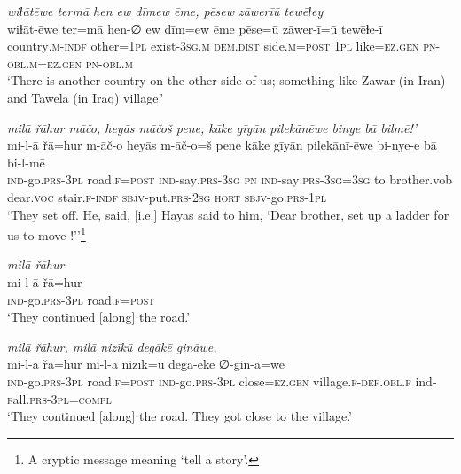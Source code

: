 \ea \label{ŽH.6}
\textit{wiɫātēwe termā hen ew dīmew ēme, pēsew zāwerīū tewēɫey} \\ 
\gll wiɫāt-ēwe ter=mā hen-∅ ew dīm=ew ēme pēse=ū zāwer-ī=ū tewēɫe-ī \\ 
 country\textsc{.m}\textsc{-indf} other\textsc{=1pl} exist\textsc{-3sg}\textsc{.m} \textsc{dem.dist} side\textsc{.m}\textsc{=\textsc{post}} \textsc{1pl} like\textsc{=ez}\textsc{.gen} \textsc{pn}\textsc{-obl}\textsc{.m}\textsc{=ez}\textsc{.gen} \textsc{pn}\textsc{-obl}\textsc{.m} \\ 
\glt `There is another country on the other side of us; something like Zawar (in Iran) and Tawela (in Iraq) village.'
\z 
 
\ea \label{ŽH.12}
\textit{milā řāhur māčo, heyās māčoš pene, kāke gīyān pilekānēwe binye bā bilmē!’} \\ 
\gll mi-l-ā řā=hur m-āč-o heyās m-āč-o=š pene kāke gīyān pilekānī-ēwe bi-nye-e bā bi-l-mē \\ 
 \textsc{ind-}go\textsc{.prs}\textsc{-3pl} road\textsc{\textsc{.f}}\textsc{=\textsc{post}} \textsc{ind-}say\textsc{.prs}\textsc{-3sg} \textsc{pn} \textsc{ind-}say\textsc{.prs}\textsc{-3sg}\textsc{=3sg} to brother.vob dear.\textsc{voc} stair\textsc{\textsc{.f}}\textsc{-indf} \textsc{sbjv-}put\textsc{.prs}-\textsc{2sg} \textsc{hort} \textsc{sbjv-}go\textsc{.prs}\textsc{-1pl} \\ 
\glt `They set off. He, said, [i.e.] Hayas said to him, ‘Dear brother, set up a ladder for us to move !’'\footnote{A cryptic message meaning ‘tell a story’.}
\z 
 
\ea \label{ŽH.14}
\textit{milā řāhur} \\ 
\gll mi-l-ā řā=hur \\ 
 \textsc{ind-}go\textsc{.prs}\textsc{-3pl} road\textsc{\textsc{.f}}\textsc{=\textsc{post}} \\ 
\glt `They continued [along] the road.'
\z 
 
\ea \label{ŽH.15}
\textit{milā řāhur, milā nizīkū degākē gināwe,} \\ 
\gll mi-l-ā řā=hur mi-l-ā nizīk=ū degā-ekē ∅-gin-ā=we \\ 
 \textsc{ind-}go\textsc{.prs}\textsc{-3pl} road\textsc{\textsc{.f}}\textsc{=\textsc{post}} \textsc{ind-}go\textsc{.prs}\textsc{-3pl} close\textsc{=ez}\textsc{.gen} village\textsc{\textsc{.f}}\textsc{-def}\textsc{.obl}\textsc{\textsc{.f}} ind\textsc{-f}all\textsc{.prs}\textsc{-3pl}\textsc{=compl} \\ 
\glt `They continued [along] the road. They got close to the village.'
\z 
 
